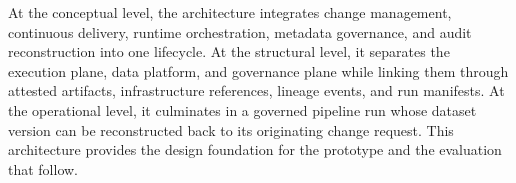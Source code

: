At the conceptual level, the architecture integrates change management,
continuous delivery, runtime orchestration, metadata governance, and audit
reconstruction into one lifecycle. At the structural level, it separates the
execution plane, data platform, and governance plane while linking them through
attested artifacts, infrastructure references, lineage events, and run
manifests. At the operational level, it culminates in a governed pipeline run
whose dataset version can be reconstructed back to its originating change
request. This architecture provides the design foundation for the prototype and
the evaluation that follow.

